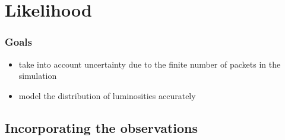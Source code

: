\documentclass[a4,12pt]{article}
\newcommand{\vecth}{\ensuremath{{\vec{\theta}}}}
\begin{document}

\section{Likelihood}\label{sec:likelihood}

\subsubsection*{Goals}
\begin{itemize}
\item take into account uncertainty due to the finite number of packets in the simulation
\item model the distribution of luminosities accurately
\end{itemize}

\subsection{Incorporating the observations}
\end{document}
